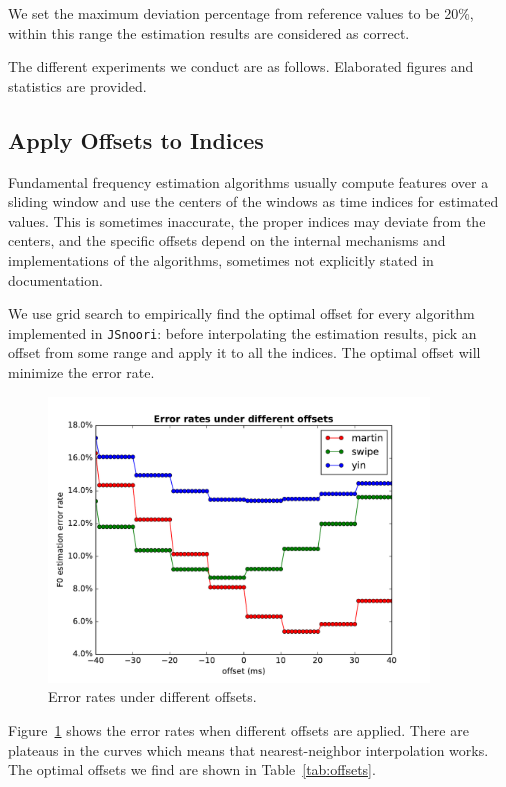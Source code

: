 \documentclass[11pt,a4paper,titlepage]{article}
\begin{document}
We set the maximum deviation percentage from reference values to be 20\%, within this range the estimation results are considered as correct.

The different experiments we conduct are as follows.
Elaborated figures and statistics are provided.

\newpage

\subsection{Apply Offsets to Indices}

Fundamental frequency estimation algorithms usually compute features over a sliding window and use the centers of the windows as time indices for estimated values.
This is sometimes inaccurate, the proper indices may deviate from the centers, and the specific offsets depend on the internal mechanisms and implementations of the algorithms, sometimes not explicitly stated in documentation.

We use grid search to empirically find the optimal offset for every algorithm implemented in \texttt{JSnoori}: before interpolating the estimation results, pick an offset from some range and apply it to all the indices.
The optimal offset will minimize the error rate.

\begin{figure}[htbp]
  \centering
  \includegraphics[width=0.9\textwidth]{error_rates_vs_offsets.pdf}
  \caption{Error rates under different offsets.} \label{fig:offsets}
\end{figure}

Figure~\ref{fig:offsets} shows the error rates when different offsets are applied.
There are plateaus in the curves which means that nearest-neighbor interpolation works.
The optimal offsets we find are shown in Table~\ref{tab:offsets}.
\end{document}

